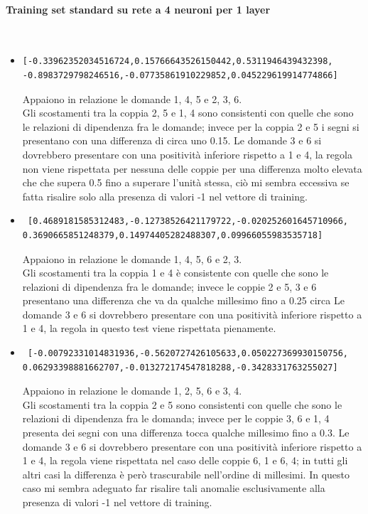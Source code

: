 \paragraph{Training set standard su rete a 4 neuroni per 1 layer}\mbox{}
\label{Training set standard su rete a 4 neuroni per 1 layer}
\\
\noindent
\begin{itemize}
\item \begin{verbatim}[-0.33962352034516724,0.15766643526150442,0.5311946439432398,
-0.8983729798246516,-0.07735861910229852,0.045229619914774866]
\end{verbatim}
Appaiono in relazione le domande 1, 4, 5 e 2, 3, 6.\\
Gli scostamenti tra la coppia 2, 5 e 1, 4 sono consistenti con quelle che sono le relazioni di dipendenza fra le domande; invece per la coppia 2 e 5  i segni si presentano con una differenza di circa uno 0.15. 
Le domande 3 e 6 si dovrebbero presentare con una positivit\`a inferiore rispetto a 1 e 4, la regola non viene rispettata per nessuna delle coppie per una differenza molto elevata che che supera 0.5 fino a superare l'unit\`a stessa, ci\`o mi sembra eccessiva se fatta risalire solo alla presenza di valori -1 nel vettore di training.

\item \begin{verbatim} [0.4689181585312483,-0.12738526421179722,-0.020252601645710966,
0.3690665851248379,0.14974405282488307,0.09966055983535718]
\end{verbatim}
Appaiono in relazione le domande 1, 4, 5, 6 e  2, 3.\\
Gli scostamenti tra la coppia  1 e 4 \`e consistente con quelle che sono le relazioni di dipendenza fra le domande; invece le coppie 2 e 5, 3 e 6 presentano una differenza che va  da qualche millesimo fino a 0.25 circa
Le domande 3 e 6 si dovrebbero presentare con una positivit\`a inferiore rispetto a 1 e 4, la regola in questo test viene rispettata pienamente.

\item \begin{verbatim} [-0.00792331014831936,-0.5620727426105633,0.050227369930150756,
0.06293398881662707,-0.013272174547818288,-0.3428331763255027]
\end{verbatim}
Appaiono in relazione le domande 1, 2, 5, 6 e 3, 4.\\
Gli scostamenti tra la coppia 2 e 5 sono consistenti con quelle che sono le relazioni di dipendenza fra le domanda; invece per le coppie 3, 6 e 1, 4 presenta dei segni con una differenza  tocca qualche millesimo fino a 0.3.
Le domande 3 e 6 si dovrebbero presentare con una positivit\`a inferiore rispetto a 1 e 4, la regola viene rispettata nel caso delle coppie 6, 1 e 6, 4; in tutti gli altri casi la differenza \`e per\`o trascurabile nell'ordine di millesimi. In questo caso  mi sembra adeguato far risalire tali anomalie esclusivamente alla presenza di valori -1 nel vettore di training. 



\end{itemize}
